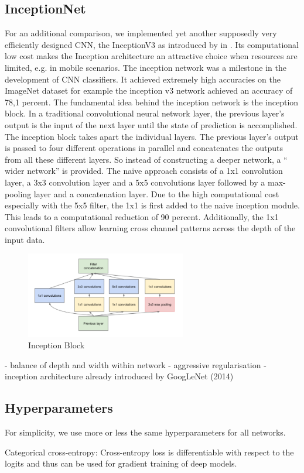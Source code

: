 \subsection{InceptionNet}
For an additional comparison, we implemented yet another supposedly very efficiently designed CNN, the InceptionV3 as introduced by \citeauthor{Szegedy2015} in \citeyear{Szegedy2015}. Its computational low cost makes the Inception architecture an attractive choice when resources are limited, e.g. in mobile scenarios. The inception network was a milestone in the development of CNN classifiers. It achieved extremely high accuracies on the ImageNet dataset for example the inception v3 network achieved an accuracy of 78,1 percent. 
The fundamental idea behind the inception network is the inception block. In a traditional convolutional neural network layer, the previous layer's output is the input of the next layer until the state of prediction is accomplished. The inception block takes apart the individual layers. The previous layer's output is passed to four different operations in parallel and concatenates the outputs from all these different layers. So instead of constructing a deeper network, a “ wider network” is provided. The naive approach consists of a 1x1 convolution layer, a 3x3 convolution layer and a 5x5 convolutions layer followed by a max-pooling layer and a concatenation layer. Due to the high computational cost especially with the 5x5 filter, the 1x1 is first added to the naive inception module. This leads to a computational reduction of 90 percent.
Additionally, the 1x1 convolutional filters allow learning cross channel patterns across the depth of the input data. 


\begin{figure}[htb]
    \centering
    \includegraphics[width=7cm]{images/InceptionNet.jpg}
    \caption{Inception Block}
    \label{fig:incepblock}
\end{figure}


- balance of depth and width within network
- aggressive regularisation
- inception architecture already introduced by GoogLeNet (2014)


\subsection{Hyperparameters}
For simplicity, we use more or less the same hyperparameters for all networks.

Categorical cross-entropy: Cross-entropy loss is differentiable with respect to the logits and thus can be used for gradient training of deep models.